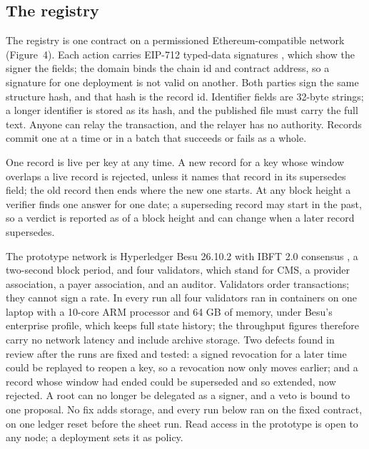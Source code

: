 \documentclass[10pt]{article}
\begin{document}
\subsection*{The registry}

The registry is one contract on a permissioned Ethereum-compatible network (Figure~4). Each action carries EIP-712 typed-data signatures \cite{eip712}, which show the signer the fields; the domain binds the chain id and contract address, so a signature for one deployment is not valid on another. Both parties sign the same structure hash, and that hash is the record id. Identifier fields are 32-byte strings; a longer identifier is stored as its hash, and the published file must carry the full text. Anyone can relay the transaction, and the relayer has no authority. Records commit one at a time or in a batch that succeeds or fails as a whole.

One record is live per key at any time. A new record for a key whose window overlaps a live record is rejected, unless it names that record in its supersedes field; the old record then ends where the new one starts. At any block height a verifier finds one answer for one date; a superseding record may start in the past, so a verdict is reported as of a block height and can change when a later record supersedes.

The prototype network is Hyperledger Besu 26.10.2 with IBFT 2.0 consensus \cite{besu}, a two-second block period, and four validators, which stand for CMS, a provider association, a payer association, and an auditor. Validators order transactions; they cannot sign a rate. In every run all four validators ran in containers on one laptop with a 10-core ARM processor and 64 GB of memory, under Besu's enterprise profile, which keeps full state history; the throughput figures therefore carry no network latency and include archive storage. Two defects found in review after the runs are fixed and tested: a signed revocation for a later time could be replayed to reopen a key, so a revocation now only moves earlier; and a record whose window had ended could be superseded and so extended, now rejected. A root can no longer be delegated as a signer, and a veto is bound to one proposal. No fix adds storage, and every run below ran on the fixed contract, on one ledger reset before the sheet run. Read access in the prototype is open to any node; a deployment sets it as policy.
\end{document}
